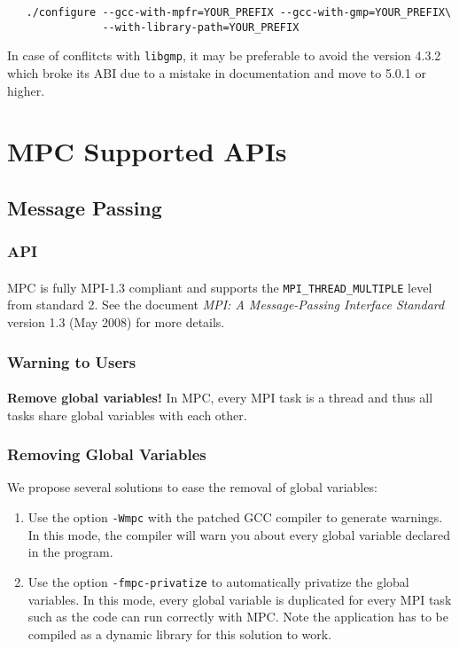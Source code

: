 \documentclass[a4paper,11pt]{article}
\begin{document}
\begin{lstlisting}
   ./configure --gcc-with-mpfr=YOUR_PREFIX --gcc-with-gmp=YOUR_PREFIX\
               --with-library-path=YOUR_PREFIX
\end{lstlisting}

In case of conflitcts with \texttt{libgmp}, it may be preferable to avoid the version 4.3.2 which
broke its ABI due to a mistake in documentation and move to 5.0.1 or higher.

\section{MPC Supported APIs}
\label{sec:APIs}

\subsection{Message Passing}

\subsubsection{API}
\paragraph{}
MPC is fully MPI-1.3 compliant and supports the \texttt{MPI\_THREAD\_MULTIPLE} level from standard 2.
See the document \emph{MPI: A Message-Passing Interface Standard} version 1.3
(May 2008) for more details.

\subsubsection{Warning to Users}
\paragraph{}
\textbf{Remove global variables!}
In MPC, every MPI task is a thread and thus all tasks share global variables
with each other.

\subsubsection{Removing Global Variables}
We propose several solutions to ease the removal of global variables:
\begin{enumerate}
\item Use the option \texttt{-Wmpc} with the patched GCC compiler to generate warnings.
In this mode, the compiler will warn you about every global variable declared in the program.
\item Use the option \texttt{-fmpc-privatize} to automatically privatize the global variables.
In this mode, every global variable is duplicated for every MPI task such as the code can run correctly with MPC.
Note the application has to be compiled as a dynamic library for this solution to work.
\end{enumerate}
\end{document}

